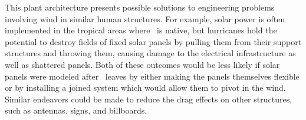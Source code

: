 This plant architecture presents possible solutions to engineering problems involving wind in similar human structures. For example, solar power is often implemented in the tropical areas where \Cxparadisi\ is native, but hurricanes hold the potential to destroy fields of fixed solar panels by pulling them from their support structures and throwing them, causing damage to the electrical infrastructure as well as shattered panels. Both of these outcomes would be less likely if solar panels were modeled after \Cxparadisi\ leaves by either making the panels themselves flexible or by installing a joined system which would allow them to pivot in the wind. Similar endeavors could be made to reduce the drag effects on other structures, such as antennas, signs, and billboards.
